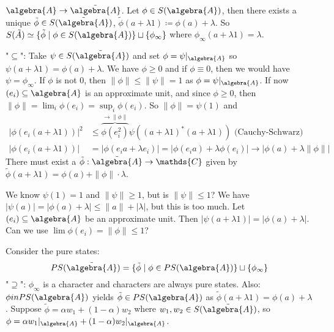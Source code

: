 \documentclass[a4paper]{article}
\begin{document}
\begin{exercise}[05-01]
	$\algebra{A} \to \tilde{\algebra{A}}$.
	Let $\phi \in S(\algebra{A})$, then there exists a unique $\tilde{\phi} \in S(\tilde{\algebra{A}})$, $\tilde{\phi}(a + \lambda 1) \coloneq \phi(a) + \lambda$.
	So $S(\tilde{A}) \simeq \{ \tilde{\phi} \mid \phi \in S(\algebra{A}) \} \sqcup \{\phi_\infty\}$ where $\phi_\infty(a + \lambda 1) = \lambda$.

	"$\subseteq$": Take $\psi \in S(\tilde{\algebra{A}})$ and set $\phi = \psi|_\algebra{A}$ so $\psi(a + \lambda 1) = \phi(a) + \lambda$.
	We have $\phi \geq 0$ and if $\phi \equiv 0$, then we would have $\psi = \phi_\infty$.
	If $\phi$ is not $ 0$, then $\|\phi\| \leq \|\psi\| = 1$ as $\phi = \psi|_\algebra{A}$.
	If now $(e_i) \subseteq \algebra{A}$ is an approximate unit, and since $\phi \geq 0$, then $\|\phi\| = \lim_i \phi(e_i)  = \sup_i \phi(e_i)$. 
	So $\|\phi\| = \psi(1)$ and 
	\begin{align*}
		|\phi(e_i (a + \lambda 1))|^2 &\leq \overbrace{\phi(e_i^2)}^{\to \|\phi\|} \psi((a + \lambda 1)^* (a + \lambda 1) ) \text{ (Cauchy-Schwarz)} \\
		|\phi(e_i(a + \lambda 1))| &= |\phi(e_i a + \lambda e_i)| = |\phi(e_i a) + \lambda \phi(e_i)| \to |\phi(a) + \lambda \| \phi \| |
	\end{align*}
	There must exist a $\tilde{\phi}: \tilde{\algebra{A}} \to \mathds{C}$ given by $\tilde{\phi}(a + \lambda 1) = \phi(a) + \|\phi\| \cdot \lambda$.

	We know $\psi(1) = 1$ and $\|\psi\| \geq 1$, but is $\|\psi\| \leq 1$?
	We have $|\psi(a)| = |\phi(a) + \lambda| \leq \|a\| + |\lambda|$, but this is too much. 
	Let $(e_i) \subseteq \algebra{A}$ be an approximate unit.
	Then $|\psi(a + \lambda 1)| = |\phi(a) + \lambda|$.
	Can we use $\lim \phi(e_i) = \|\phi\| \leq 1$?


	Consider the pure states:
	\begin{equation*}
		PS(\tilde{\algebra{A}}) = \{ \tilde{\phi} \mid \phi \in PS(\algebra{A}) \} \sqcup \{\phi_\infty\}
	\end{equation*}
	"$\supseteq$": $\phi_\infty$ is a character and characters are always pure states.
	Also: $\phi in PS(\algebra{A})$ yields $\tilde{\phi} \in PS(\algebra{A})$ as $\tilde{\phi}(a + \lambda 1) = \phi(a) + \lambda$.
	Suppose $\tilde{\phi} = \alpha w_1 + (1 - \alpha)w_2$ where $w_1, w_2 \in S(\tilde{\algebra{A}})$, so $\phi = \alpha w_1|_\algebra{A} + (1 - \alpha) w_2|_\algebra{A}$.



\end{exercise}
\end{document}
